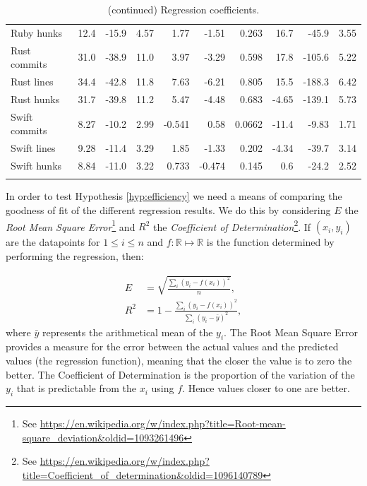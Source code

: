 \documentclass[pdflatex, sn-mathphys, referee]{sn-jnl}%
\theoremstyle{thmstyleone}%
\theoremstyle{thmstyletwo}%
\theoremstyle{thmstylethree}%
\def\tablelinesep{}
\theoremstyle{thmstyleone}
\begin{document}
\begin{table}
\begin{center}
\begin{minipage}{0.73\textwidth}
\begin{tabular*}{\textwidth}{l r r r r r r r r r }
Ruby hunks & 12.4 & -15.9 & 4.57 & 1.77 & -1.51 & 0.263 & 16.7 & -45.9 & 3.55 \\ \tablelinesep
Rust commits & 31.0 & -38.9 & 11.0 & 3.97 & -3.29 & 0.598 & 17.8 & -105.6 & 5.22 \\
Rust lines & 34.4 & -42.8 & 11.8 & 7.63 & -6.21 & 0.805 & 15.5 & -188.3 & 6.42 \\
Rust hunks & 31.7 & -39.8 & 11.2 & 5.47 & -4.48 & 0.683 & -4.65 & -139.1 & 5.73 \\ \tablelinesep
Swift commits & 8.27 & -10.2 & 2.99 & -0.541 & 0.58 & 0.0662 & -11.4 & -9.83 & 1.71 \\
Swift lines & 9.28 & -11.4 & 3.29 & 1.85 & -1.33 & 0.202 & -4.34 & -39.7 & 3.14 \\
Swift hunks & 8.84 & -11.0 & 3.22 & 0.733 & -0.474 & 0.145 & 0.6 & -24.2 & 2.52 \\
\botrule
\end{tabular*}
\caption{(continued) Regression coefficients.}
\end{minipage}
\end{center}
\end{table}


In order to test Hypothesis \ref{hyp:efficiency} we need a means of comparing the goodness of fit of the different regression results. We do this by considering $E$ the {\it Root Mean Square Error\/}\footnote{See \url{https://en.wikipedia.org/w/index.php?title=Root-mean-square_deviation&oldid=1093261496}} and $R^2$ the {\it Coefficient of Determination\/}\footnote{See \url{https://en.wikipedia.org/w/index.php?title=Coefficient_of_determination&oldid=1096140789}}. If $(x_i, y_i)$ are the datapoints for $1 \le i \le n$ and $f : \mathbb{R} \mapsto \mathbb{R}$ is the function determined by performing the regression, then:

\begin{align}
E   & = \sqrt{\frac{\sum_i (y_i - f(x_i))^2}{n}}, \\
R^2 & = 1 - \frac{\sum_i (y_i - f(x_i))^2}{\sum_i (y_i - \bar{y})^2},
\end{align}
where $\bar{y}$ represents the arithmetical mean of the $y_i$. The Root Mean Square Error provides a measure for the error between the actual values and the predicted values (the regression function), meaning that the closer the value is to zero the better. The Coefficient of Determination is the proportion of the variation of the $y_i$ that is predictable from the $x_i$ using $f$. Hence values closer to one are better.
\end{document}
